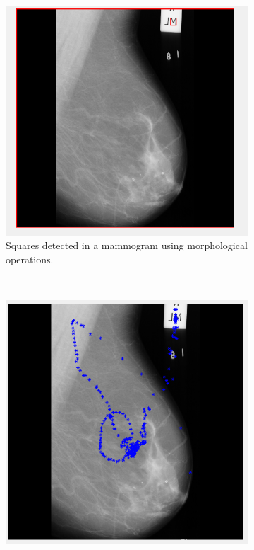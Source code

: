 \begin{figure}[H]
    \centering
    \begin{subfigure}[t]{0.3\textwidth}
        \includegraphics[width=\textwidth]{Chapter2/technical-img/morph.png}
        \caption{Squares detected in a mammogram using morphological operations.}
        \label{fig:morph}
    \end{subfigure} \hfill
    ~ %
    \begin{subfigure}[t]{0.3\textwidth}
        \includegraphics[width=\textwidth]{Chapter2/technical-img/regionprops.png}

\end{subfigure}
\end{figure}
